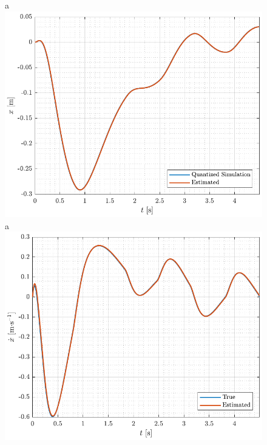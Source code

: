 %
\begin{figure}[H]
  \hspace{-10pt}
  \captionbox
  {
    a
    \label{fig:x_KFsim}
  }
  {
    \hspace{-1cm}
    \includegraphics[width=.5\textwidth]{figures/x_KFsim}
  }
  \hspace{20pt}
  \captionbox 
  {
    a
    \label{fig:xDot_KFsim}
  }
  {
    \hspace{-1cm}
    \includegraphics[width=.5\textwidth]{figures/xDot_KFsim}
  }  
\end{figure}
%
%


















